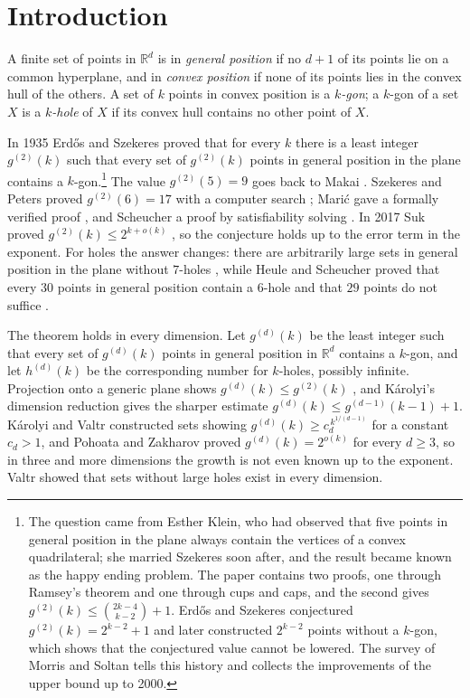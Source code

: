 \documentclass[aps,prd,twocolumn,superscriptaddress,nofootinbib,longbibliography,floatfix,showkeys,amsmath,amssymb,10pt]{revtex4-2}
\theoremstyle{plain}
\theoremstyle{definition}
\theoremstyle{plain}
\newcommand{\R}{\mathbb{R}}
\begin{document}
\section{Introduction}\label{sec:intro}

A finite set of points in $\R^d$ is in \emph{general position} if no $d+1$ of its points lie on a common hyperplane, and in \emph{convex position} if none of its points lies in the convex hull of the others. A set of $k$ points in convex position is a \emph{$k$-gon}; a $k$-gon of a set $X$ is a \emph{$k$-hole} of $X$ if its convex hull contains no other point of $X$.

In 1935 Erd\H{o}s and Szekeres \cite{ES35} proved that for every $k$ there is a least integer $g^{(2)}(k)$ such that every set of $g^{(2)}(k)$ points in general position in the plane contains a $k$-gon.\footnote{The question came from Esther Klein, who had observed that five points in general position in the plane always contain the vertices of a convex quadrilateral; she married Szekeres soon after, and the result became known as the happy ending problem. The paper \cite{ES35} contains two proofs, one through Ramsey's theorem and one through cups and caps, and the second gives $g^{(2)}(k)\le\binom{2k-4}{k-2}+1$. Erd\H{o}s and Szekeres conjectured $g^{(2)}(k)=2^{k-2}+1$ and later constructed $2^{k-2}$ points without a $k$-gon, which shows that the conjectured value cannot be lowered. The survey of Morris and Soltan \cite{MS00} tells this history and collects the improvements of the upper bound up to 2000.} The value $g^{(2)}(5)=9$ goes back to Makai \cite{MS00}. Szekeres and Peters proved $g^{(2)}(6)=17$ with a computer search \cite{SP06}; Mari\'c gave a formally verified proof \cite{Mar19}, and Scheucher a proof by satisfiability solving \cite{Sch23}. In 2017 Suk proved $g^{(2)}(k)\le 2^{k+o(k)}$ \cite{Suk17}, so the conjecture holds up to the error term in the exponent. For holes the answer changes: there are arbitrarily large sets in general position in the plane without $7$-holes \cite{MS00}, while Heule and Scheucher proved that every $30$ points in general position contain a $6$-hole and that $29$ points do not suffice \cite{HS24}.

The theorem holds in every dimension. Let $g^{(d)}(k)$ be the least integer such that every set of $g^{(d)}(k)$ points in general position in $\R^d$ contains a $k$-gon, and let $h^{(d)}(k)$ be the corresponding number for $k$-holes, possibly infinite. Projection onto a generic plane shows $g^{(d)}(k)\le g^{(2)}(k)$ \cite{MS00}, and Károlyi's dimension reduction \cite{Kar01} gives the sharper estimate $g^{(d)}(k)\le g^{(d-1)}(k-1)+1$. Károlyi and Valtr \cite{KV03} constructed sets showing $g^{(d)}(k)\ge c_d^{\,k^{1/(d-1)}}$ for a constant $c_d>1$, and Pohoata and Zakharov \cite{PZ25} proved $g^{(d)}(k)=2^{o(k)}$ for every $d\ge3$, so in three and more dimensions the growth is not even known up to the exponent. Valtr \cite{Val92} showed that sets without large holes exist in every dimension.
\end{document}
